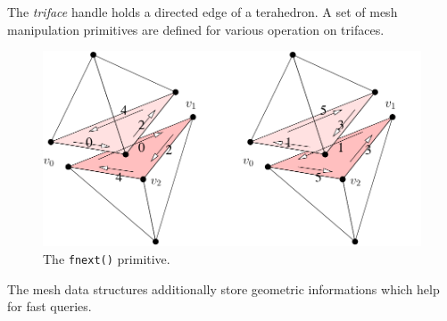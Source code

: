 The {\it triface} handle holds a directed edge of a terahedron. A set of mesh manipulation primitives are defined for various operation on trifaces.

\begin{figure}
  \centering
  \includegraphics[width=1.0\textwidth]{../figs/fnext-base}
\caption{The {\tt fnext()} primitive.}
\label{fig:fnext}
\end{figure}


The mesh data structures additionally store geometric informations which help for fast queries.



